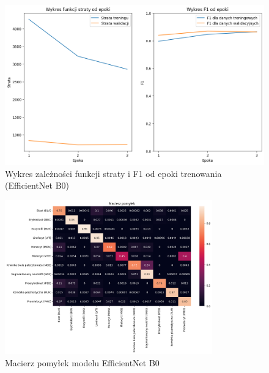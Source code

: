 \begin{figure}
    \centering
    \includegraphics[width=\textwidth]{experiments/efficientnet_b0/combined}
    \caption{Wykres zależności funkcji straty i F1 od epoki trenowania (EfficientNet B0)}
    \label{fig:plot_efficientnet_b0}
\end{figure}
\begin{figure}
    \centering
    \includegraphics[width=0.8\textwidth]{experiments/efficientnet_b0/confusion_matrix}
    \caption{Macierz pomyłek modelu EfficientNet B0}
    \label{fig:confusion_efficientnet_b0}
\end{figure}

